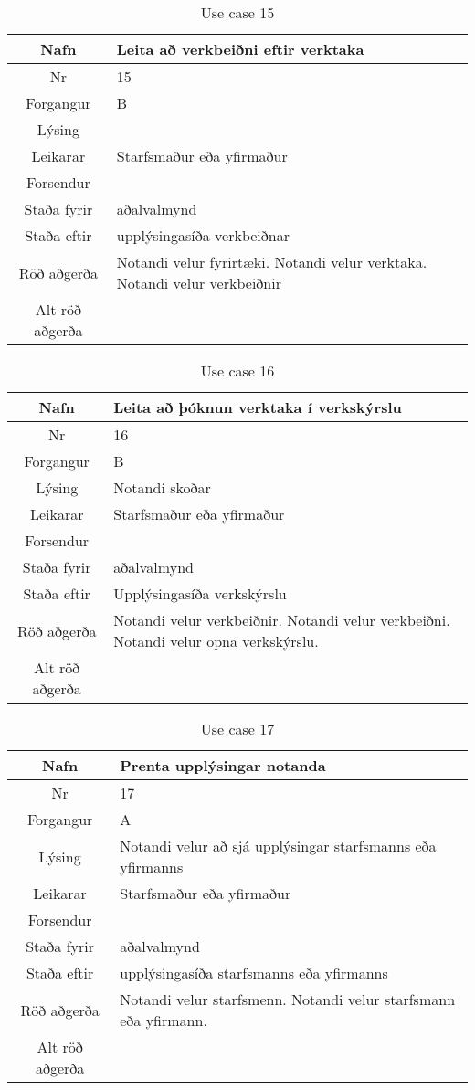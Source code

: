 \begin{table}[h!]\centering
\begin{tabular}{|c|p{10cm}|}
\hline
Nafn&Leita að verkbeiðni eftir verktaka\\
\hline
Nr&15\\
\hline
Forgangur&B\\
\hline
Lýsing&\\
\hline
Leikarar&Starfsmaður eða yfirmaður\\
\hline
Forsendur&\\
\hline
Staða fyrir&aðalvalmynd\\
\hline
Staða eftir&upplýsingasíða verkbeiðnar\\
\hline
Röð aðgerða&Notandi velur fyrirtæki. Notandi velur verktaka. Notandi velur verkbeiðnir\\
\hline
Alt röð aðgerða&\\
\hline
\end{tabular}
\caption{Use case 15}\label{tab:use_case_15}
\end{table}
\begin{table}[h!]\centering
\begin{tabular}{|c|p{10cm}|}
\hline
Nafn&Leita að þóknun verktaka í verkskýrslu\\
\hline
Nr&16\\
\hline
Forgangur&B\\
\hline
Lýsing&Notandi skoðar\\
\hline
Leikarar&Starfsmaður eða yfirmaður\\
\hline
Forsendur&\\
\hline
Staða fyrir&aðalvalmynd\\
\hline
Staða eftir&Upplýsingasíða verkskýrslu\\
\hline
Röð aðgerða&Notandi velur verkbeiðnir. Notandi velur verkbeiðni. Notandi velur opna verkskýrslu.\\
\hline
Alt röð aðgerða&\\
\hline
\end{tabular}
\caption{Use case 16}\label{tab:use_case_16}
\end{table}
\begin{table}[h!]\centering
\begin{tabular}{|c|p{10cm}|}
\hline
Nafn&Prenta upplýsingar notanda\\
\hline
Nr&17\\
\hline
Forgangur&A\\
\hline
Lýsing&Notandi velur að sjá upplýsingar starfsmanns eða yfirmanns\\
\hline
Leikarar&Starfsmaður eða yfirmaður\\
\hline
Forsendur&\\
\hline
Staða fyrir&aðalvalmynd\\
\hline
Staða eftir&upplýsingasíða starfsmanns eða yfirmanns\\
\hline
Röð aðgerða&Notandi velur starfsmenn. Notandi velur starfsmann eða yfirmann.\\
\hline
Alt röð aðgerða&\\
\hline
\end{tabular}
\caption{Use case 17}\label{tab:use_case_17}
\end{table}

